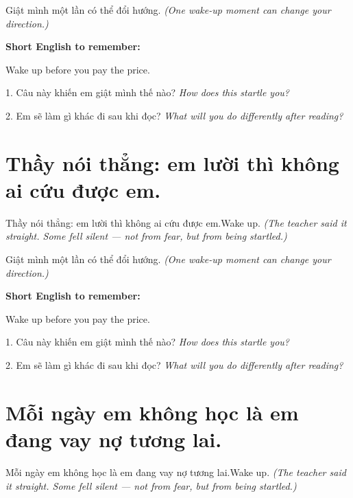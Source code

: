 \begin{baihoc}
Giật mình một lần có thể đổi hướng.
\textit{(One wake-up moment can change your direction.)}
\end{baihoc}

\begin{ghinhoanh}
\textbf{Short English to remember:}

Wake up before you pay the price.

\end{ghinhoanh}

\begin{tuhocnhanh}
1. Câu này khiến em giật mình thế nào? \textit{How does this startle you?}

2. Em sẽ làm gì khác đi sau khi đọc? \textit{What will you do differently after reading?}
\end{tuhocnhanh}
\ngancach


\section{Thầy nói thẳng: em lười thì không ai cứu được em.}
\begin{truyen}{Thầy nói thẳng: em lười thì không ai cứu được em.}{Wake up.}
\textit{(The teacher said it straight. Some fell silent — not from fear, but from being startled.)}
\end{truyen}

\begin{baihoc}
Giật mình một lần có thể đổi hướng.
\textit{(One wake-up moment can change your direction.)}
\end{baihoc}

\begin{ghinhoanh}
\textbf{Short English to remember:}

Wake up before you pay the price.

\end{ghinhoanh}

\begin{tuhocnhanh}
1. Câu này khiến em giật mình thế nào? \textit{How does this startle you?}

2. Em sẽ làm gì khác đi sau khi đọc? \textit{What will you do differently after reading?}
\end{tuhocnhanh}
\ngancach


\section{Mỗi ngày em không học là em đang vay nợ tương lai.}
\begin{truyen}{Mỗi ngày em không học là em đang vay nợ tương lai.}{Wake up.}
\textit{(The teacher said it straight. Some fell silent — not from fear, but from being startled.)}
\end{truyen}

